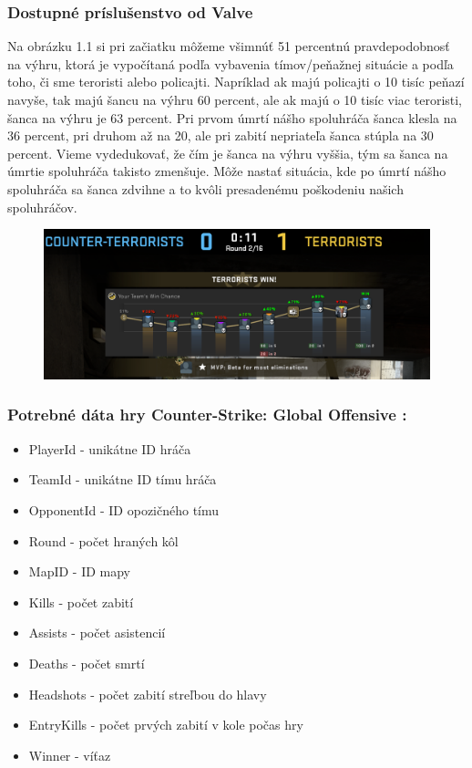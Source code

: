  \subsubsection{Dostupné príslušenstvo od Valve}
Na obrázku 1.1 si pri začiatku môžeme všimnúť 51 percentnú pravdepodobnosť na výhru, ktorá je vypočítaná podľa vybavenia tímov/peňažnej situácie a podľa toho, či sme teroristi alebo policajti. Napríklad ak majú policajti o 10 tisíc peňazí navyše, tak majú šancu na výhru 60 percent, ale ak majú o 10 tisíc viac teroristi, šanca na výhru je 63 percent. Pri prvom úmrtí nášho spoluhráča šanca klesla na 36 percent, pri druhom až na 20, ale pri zabití nepriateľa šanca stúpla na 30 percent. Vieme vydedukovať, že čím je šanca na výhru vyššia, tým sa šanca na úmrtie spoluhráča takisto zmenšuje. Môže nastať situácia, kde po úmrtí nášho spoluhráča sa šanca zdvihne a to kvôli presadenému poškodeniu našich spoluhráčov.
  
 \begin{figure}[h!]
 
 	\includegraphics[width=.9\textwidth]{figures/jednanula}
 	\centering
 	\caption{ \label{jednanula}}
 \end{figure}

 

\subsubsection{Potrebné dáta hry Counter-Strike: Global Offensive :}

 \begin{itemize}
 	\item PlayerId - unikátne ID hráča
 	\item TeamId - unikátne ID tímu hráča
 	\item OpponentId - ID opozičného tímu
 	\item Round - počet hraných kôl
 	\item MapID - ID mapy
 	\item Kills - počet zabití
 	\item Assists - počet asistencií
 	\item Deaths - počet smrtí
 	\item Headshots - počet zabití streľbou do hlavy
 	\item EntryKills - počet prvých zabití v kole počas hry
 	\item Winner - víťaz
\end{itemize}
 


